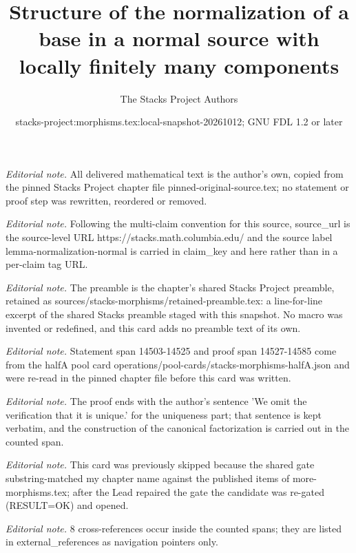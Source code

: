 \documentclass[10pt,a4paper]{amsart}
\title{Structure of the normalization of a base in a normal source with locally finitely many components}
\author{The Stacks Project Authors}
\date{stacks-project:morphisms.tex:local-snapshot-20261012; GNU FDL 1.2 or later}
\theoremstyle{plain}
\theoremstyle{definition}
\theoremstyle{remark}
\numberwithin{equation}{subsection}
\begin{document}
\maketitle
\noindent\textit{Editorial note.} All delivered mathematical text is the author's own, copied from the pinned Stacks Project chapter file pinned-original-source.tex; no statement or proof step was rewritten, reordered or removed.\par\medskip
\noindent\textit{Editorial note.} Following the multi-claim convention for this source, source\_url is the source-level URL https://stacks.math.columbia.edu/ and the source label lemma-normalization-normal is carried in claim\_key and here rather than in a per-claim tag URL.\par\medskip
\noindent\textit{Editorial note.} The preamble is the chapter's shared Stacks Project preamble, retained as sources/stacks-morphisms/retained-preamble.tex: a line-for-line excerpt of the shared Stacks preamble staged with this snapshot. No macro was invented or redefined, and this card adds no preamble text of its own.\par\medskip
\noindent\textit{Editorial note.} Statement span 14503-14525 and proof span 14527-14585 come from the halfA pool card operations/pool-cards/stacks-morphisms-halfA.json and were re-read in the pinned chapter file before this card was written.\par\medskip
\noindent\textit{Editorial note.} The proof ends with the author's sentence 'We omit the verification that it is unique.' for the uniqueness part; that sentence is kept verbatim, and the construction of the canonical factorization is carried out in the counted span.\par\medskip
\noindent\textit{Editorial note.} This card was previously skipped because the shared gate substring-matched my chapter name against the published items of more-morphisms.tex; after the Lead repaired the gate the candidate was re-gated (RESULT=OK) and opened.\par\medskip
\noindent\textit{Editorial note.} 8 cross-references occur inside the counted spans; they are listed in external\_references as navigation pointers only.\par\medskip
\end{document}
